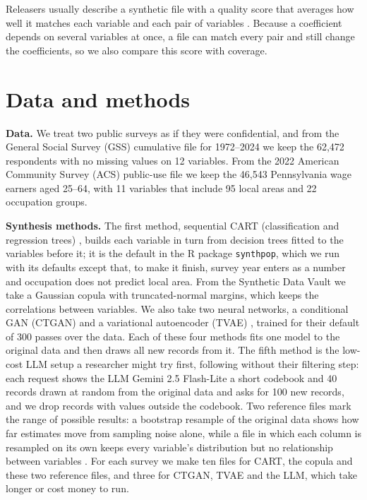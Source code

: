 \documentclass[10pt]{article}
\begin{document}
Releasers usually describe a synthetic file with a quality score that averages how well it matches
each variable and each pair of variables \citep{patki2016}. Because a coefficient depends on
several variables at once, a file can match every pair and still change the coefficients, so we also
compare this score with coverage.

\section{Data and methods}
\textbf{Data.} We treat two public surveys as if they were confidential, and from the General
Social Survey (GSS) cumulative file for 1972--2024 we keep the 62,472 respondents with no missing values
on 12 variables. From the 2022 American Community Survey (ACS) public-use file we keep the 46,543
Pennsylvania wage earners aged 25--64, with 11 variables that include 95 local areas and 22 occupation
groups.

\textbf{Synthesis methods.} The first method, sequential CART (classification and regression trees) \citep{reiter2005}, builds each variable in
turn from decision trees fitted to the variables before it; it is the default in the R package
\texttt{synthpop}, which we run with its defaults except that, to make it finish, survey year enters as a number and occupation does not predict local area. From the Synthetic Data Vault \citep{patki2016}
we take a Gaussian copula with truncated-normal margins, which keeps the correlations between
variables. We also take two neural networks, a conditional GAN (CTGAN) and a variational autoencoder (TVAE) \citep{xu2019}, trained for their default of 300 passes over the data. Each of these four methods fits one model to the
original data and then draws all new records from it. The fifth method is the low-cost LLM setup a researcher
might try first, following \citet{seedat2024} without their filtering step: each request shows the LLM Gemini 2.5 Flash-Lite a short codebook and 40
records drawn at random from the original data and asks for 100 new records, and we drop records with
values outside the codebook. Two reference files mark the range of possible results: a bootstrap
resample of the original data shows how far estimates move from sampling noise alone, while a file in which each
column is resampled on its own keeps every variable's distribution but no relationship between variables
\citep{raab2017}. For each survey we make ten files for CART, the copula and these two reference files,
and three for CTGAN, TVAE and the LLM, which take longer or cost money to run.
\end{document}
